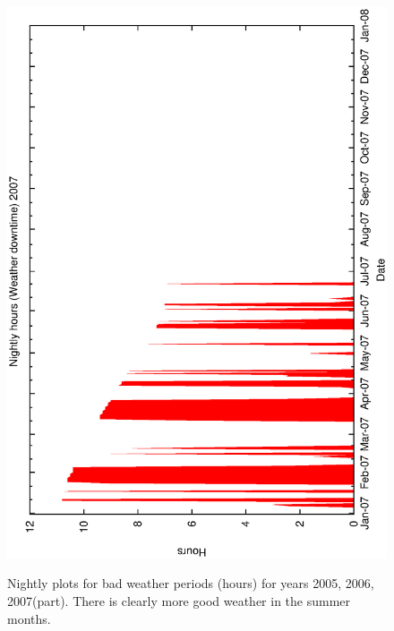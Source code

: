 {{\begin{figure}[htbp]
\begin{center}
{     \includegraphics[scale=0.3, angle=-90]{figures/ecs/met_nightly_stats_weather2007.eps}
     \label{fig:nightly_weather2007}
  }
\end{center}
\caption[Bad weather periods for years 2005, 2006, 2007(part).]
{Nightly plots for bad weather periods (hours) for years 2005, 2006, 2007(part). There is clearly more good weather in the summer months.}  
\label{fig:met_nightly_weather}
\end{figure}





}}
